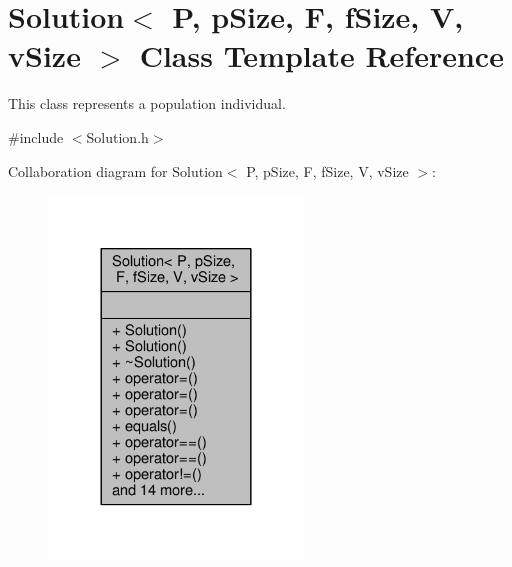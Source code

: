 \hypertarget{classSolution}{}\section{Solution$<$ P, p\+Size, F, f\+Size, V, v\+Size $>$ Class Template Reference}
\label{classSolution}


This class represents a population individual.  




{\ttfamily \#include $<$Solution.\+h$>$}



Collaboration diagram for Solution$<$ P, p\+Size, F, f\+Size, V, v\+Size $>$\+:\nopagebreak
\begin{figure}[H]
\begin{center}
\leavevmode
\includegraphics[width=192pt]{classSolution__coll__graph}
\end{center}
\end{figure}
